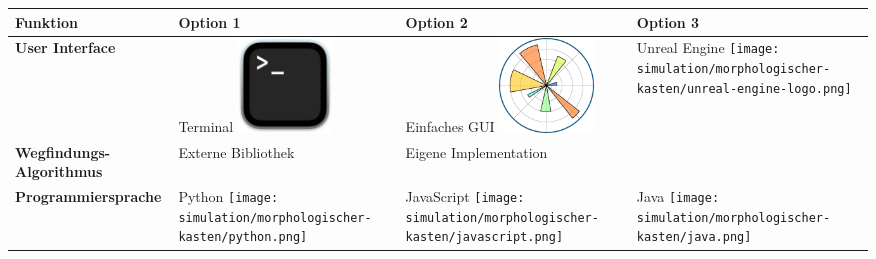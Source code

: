 \documentclass[../main.tex]{subfiles}
\begin{document}

\begin{table}[htbp]
    \centering
    \begin{tabularx}{\textwidth}{| X | Y | Y | Y |}
        \hline

        \textbf{Funktion} & \textbf{Option 1} & \textbf{Option 2} & \textbf{Option 3} \\ \hline
        
        \textbf{User Interface} &     
        Terminal \newline
        \includegraphics[width=2.5cm]{img/simulation/morphologischer-kasten/terminal.png}
        &
        Einfaches GUI \newline
        \includegraphics[width=2.5cm]{img/simulation/morphologischer-kasten/simple-gui.png}
        &
        Unreal Engine \newline
        \texttt{[image: simulation/morphologischer-kasten/unreal-engine-logo.png]}
        \\ \hline
        
        \textbf{Wegfindungs-Algorithmus}  &
        Externe Bibliothek &
        Eigene Implementation &
        \\ \hline
        
        \textbf{Programmiersprache}      &
        Python \newline
        \texttt{[image: simulation/morphologischer-kasten/python.png]} 
        &
        JavaScript \newline
        \texttt{[image: simulation/morphologischer-kasten/javascript.png]}
        &
        Java \newline
        \texttt{[image: simulation/morphologischer-kasten/java.png]}
        \\ \hline
        

\end{tabularx}
\end{table}
\end{document}
